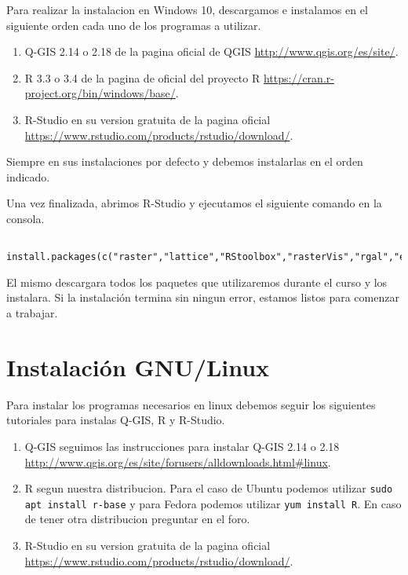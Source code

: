Para realizar la instalacion en Windows 10, descargamos e instalamos en el siguiente orden cada uno de los programas a utilizar.

\begin{enumerate}
  \item Q-GIS 2.14 o 2.18 de la pagina oficial de QGIS \url{http://www.qgis.org/es/site/}.
  \item R 3.3 o 3.4 de la pagina de oficial del proyecto R \url{https://cran.r-project.org/bin/windows/base/}.
  \item R-Studio en su version gratuita de la pagina oficial \url{https://www.rstudio.com/products/rstudio/download/}.
\end{enumerate}

Siempre en sus instalaciones por defecto y debemos instalarlas en el orden  indicado.

Una vez finalizada, abrimos R-Studio y ejecutamos el siguiente comando en la consola.

\begin{lstlisting}
  install.packages(c("raster","lattice","RStoolbox","rasterVis","rgal","e1071","randomForest","kernlab"))
\end{lstlisting}

El mismo descargara todos los paquetes que utilizaremos durante el curso y los instalara. Si la instalaci\'on termina sin ningun error, estamos listos para comenzar a trabajar.

\section{Instalaci\'on GNU/Linux}

Para instalar los programas necesarios en linux debemos seguir los siguientes tutoriales para instalas Q-GIS, R y R-Studio.

\begin{enumerate}
  \item Q-GIS seguimos las instrucciones para instalar Q-GIS 2.14 o 2.18 \url{http://www.qgis.org/es/site/forusers/alldownloads.html#linux}.
  \item R segun nuestra distribucion. Para el caso de Ubuntu podemos utilizar \texttt{sudo apt install r-base} y para Fedora podemos utilizar \texttt{yum install R}. En caso de tener otra distribucion preguntar en el foro.
  \item R-Studio en su version gratuita de la pagina oficial \url{https://www.rstudio.com/products/rstudio/download/}.
\end{enumerate}

